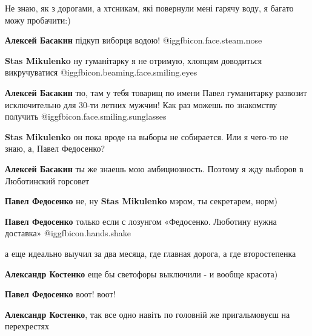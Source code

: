  
 
 
 
 
\qqSecCmt

\begin{itemize} %

Не знаю, як з дорогами, а хтсникам, які повернули мені гарячу воду, я багато
можу пробачити:)

\begin{itemize} %
\textbf{Алексей Басакин} підкуп виборця водою!  @igg{fbicon.face.steam.nose} 

\textbf{Stas Mikulenko} ну гуманітарку я не отримую, хлопцям доводиться викручуватися @igg{fbicon.beaming.face.smiling.eyes} 

\textbf{Алексей Басакин} тю, там у тебя товарищ по имени Павел гуманитарку развозит исключительно для 30-ти летних мужчин! Как раз можешь по знакомству получить  @igg{fbicon.face.smiling.sunglasses} 

\textbf{Stas Mikulenko} он пока вроде на выборы не собирается. Или я чего-то не знаю, а, Павел Федосенко?

\textbf{Алексей Басакин} ты же знаешь мою амбициозность. Поэтому я жду выборов в Люботинский горсовет

\textbf{Павел Федосенко} не, ну \textbf{Stas Mikulenko} мэром, ты секретарем, норм)

\textbf{Павел Федосенко} только если с лозунгом «Федосенко. Люботину нужна доставка»  @igg{fbicon.hands.shake} 
\end{itemize} %

а еще идеально выучил за два месяца, где главная дорога, а где второстепенка

\begin{itemize} %
\textbf{Александр Костенко} еще бы светофоры выключили - и вообще красота)

\textbf{Павел Федосенко} воот! воот!

\textbf{Александр Костенко}, так все одно навіть по головній же пригальмовуєш на перехрестях


\end{itemize}
\end{itemize}

